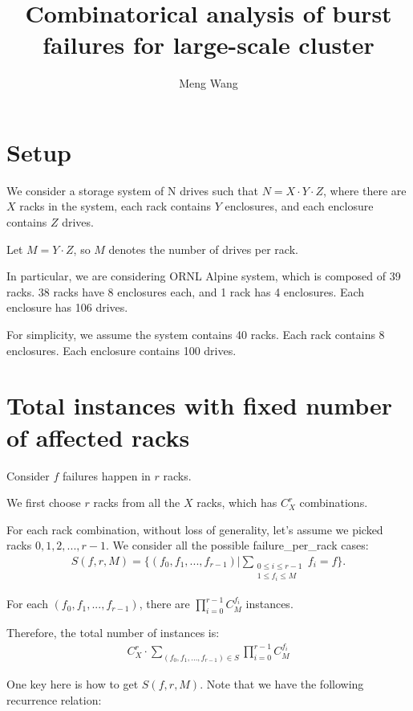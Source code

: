 \documentclass{article}
\title{Combinatorical analysis of burst failures for large-scale cluster}
\author{Meng Wang}
\begin{document}
\maketitle

\section{Setup}
We consider a storage system of N drives such that $N = X \cdot Y \cdot Z$, where there are $X$ racks in the system, each rack contains $Y$ enclosures, and each enclosure contains $Z$ drives.

Let $M = Y \cdot Z$, so $M$ denotes the number of drives per rack.

In particular, we are considering ORNL Alpine system, which is composed of 39 racks. 38 racks have 8 enclosures each, and 1 rack has 4 enclosures. Each enclosure has 106 drives.

For simplicity, we assume the system contains 40 racks. Each rack contains 8 enclosures. Each enclosure contains 100 drives.

\section{Total instances with fixed number of affected racks}

Consider $f$ failures happen in $r$ racks.

We first choose $r$ racks from all the $X$ racks, which has $C_{X}^{r}$ combinations.

For each rack combination, without loss of generality, let's assume we picked racks $0, 1, 2, ..., r-1$.
We consider all the possible failure\_per\_rack cases:
\begin{eqnarray}
S(f,r,M) = \{(f_0, f_1, ..., f_{r-1}) | \sum_{\substack{0 \leq i \leq r-1 \\ 1 \leq f_i \leq M}}f_i=f\}.
\end{eqnarray}


For each $(f_0, f_1, ..., f_{r-1})$, there are $\prod_{i=0}^{r-1}C_{M}^{f_i}$ instances.

Therefore, the total number of instances is:
\begin{eqnarray}
  C_{X}^{r} \cdot \sum_{(f_0, f_1, ..., f_{r-1}) \in S} \prod_{i=0}^{r-1}C_{M}^{f_i}
\label{eq:tcf}
\end{eqnarray}

One key here is how to get $S(f,r,M)$. Note that we have the following recurrence relation:
\end{document}
